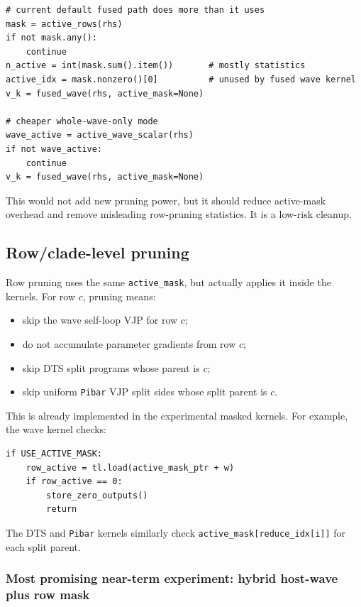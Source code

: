 \documentclass[11pt]{article}
\newcommand{\code}[1]{\texttt{#1}}
\begin{document}
\begin{lstlisting}
# current default fused path does more than it uses
mask = active_rows(rhs)
if not mask.any():
    continue
n_active = int(mask.sum().item())       # mostly statistics
active_idx = mask.nonzero()[0]          # unused by fused wave kernel
v_k = fused_wave(rhs, active_mask=None)

# cheaper whole-wave-only mode
wave_active = active_wave_scalar(rhs)
if not wave_active:
    continue
v_k = fused_wave(rhs, active_mask=None)
\end{lstlisting}

This would not add new pruning power, but it should reduce active-mask overhead
and remove misleading row-pruning statistics.  It is a low-risk cleanup.

\subsection{Row/clade-level pruning}

Row pruning uses the same \code{active\_mask}, but actually applies it inside
the kernels.  For row \(c\), pruning means:

\begin{itemize}[leftmargin=*]
\item skip the wave self-loop VJP for row \(c\);
\item do not accumulate parameter gradients from row \(c\);
\item skip DTS split programs whose parent is \(c\);
\item skip uniform \code{Pibar} VJP split sides whose split parent is \(c\).
\end{itemize}

This is already implemented in the experimental masked kernels.  For example,
the wave kernel checks:

\begin{lstlisting}
if USE_ACTIVE_MASK:
    row_active = tl.load(active_mask_ptr + w)
    if row_active == 0:
        store_zero_outputs()
        return
\end{lstlisting}

The DTS and \code{Pibar} kernels similarly check
\code{active\_mask[reduce\_idx[i]]} for each split parent.

\subsubsection{Most promising near-term experiment: hybrid host-wave plus row mask}
\end{document}
